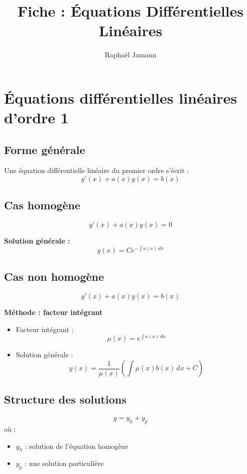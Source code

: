 \documentclass[a4paper,11pt]{article}
\title{Fiche : Équations Différentielles Linéaires}
\author{Raphaël Jamann}
\date{}
\begin{document}
    \maketitle

    \section*{Équations différentielles linéaires d'ordre 1}

        \subsection*{Forme générale}
            Une équation différentielle linéaire du premier ordre s'écrit :
            \[
            y'(x) + a(x)y(x) = b(x)
            \]

        \subsection*{Cas homogène}
            \[
            y'(x) + a(x)y(x) = 0
            \]

            \textbf{Solution générale :}
            \[
            y(x) = C e^{-\int a(x)\,dx}
            \]

        \subsection*{Cas non homogène}
            \[
            y'(x) + a(x)y(x) = b(x)
            \]

            \textbf{Méthode : facteur intégrant}

            \begin{itemize}
                \item Facteur intégrant :
                \[
                \mu(x) = e^{\int a(x)\,dx}
                \]
                \item Solution générale :
                \[
                y(x) = \frac{1}{\mu(x)} \left( \int \mu(x)b(x)\,dx + C \right)
                \]
            \end{itemize}

        \subsection*{Structure des solutions}
            \[
            y = y_h + y_p
            \]
            où :
            \begin{itemize}
                \item $y_h$ : solution de l'équation homogène
                \item $y_p$ : une solution particulière
            \end{itemize}
\end{document}
